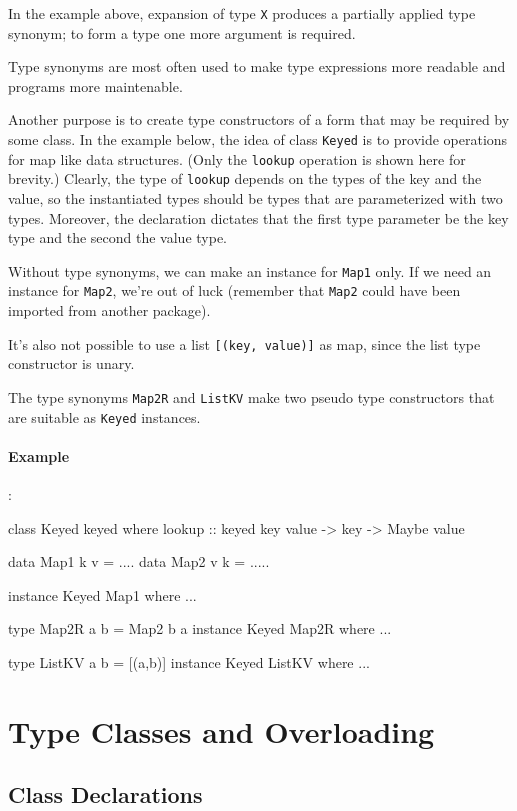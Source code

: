 In the example above, expansion of type \texttt{X} produces a partially applied type synonym; to form a type one more argument is required.

Type synonyms are most often used to make type expressions more readable and programs more maintenable.

Another purpose is to create type constructors of a form that may be required by some class. In the example below, the idea of class \texttt{Keyed} is to provide operations for map like data structures. (Only the \texttt{lookup} operation is shown here for brevity.) Clearly, the type of \texttt{lookup} depends on the types of the key and the value, so the instantiated types should be types that are parameterized with two types. Moreover, the declaration dictates that the first type parameter be the key type and the second the value type.

Without type synonyms, we can make an instance for \texttt{Map1} only. If we need an instance for \texttt{Map2}, we're  out of luck (remember that \texttt{Map2} could have been imported from another package).

It's also not possible to use a list \texttt{[(key, value)]} as map, since the list type constructor is unary.

The type synonyms \texttt{Map2R} and \texttt{ListKV} make two pseudo type constructors that are suitable as \texttt{Keyed} instances.

\paragraph*{Example}:

\begin{code}
class Keyed keyed where
    lookup :: keyed key value -> key -> Maybe value

data Map1 k v = ....
data Map2 v k = .....

instance Keyed Map1 where ...

type Map2R a b = Map2 b a
instance Keyed Map2R where ...

type ListKV a b = [(a,b)]
instance Keyed ListKV where ...
\end{code}

\section{Type Classes and Overloading}
\subsection{Class Declarations} \label{classdcl}  

